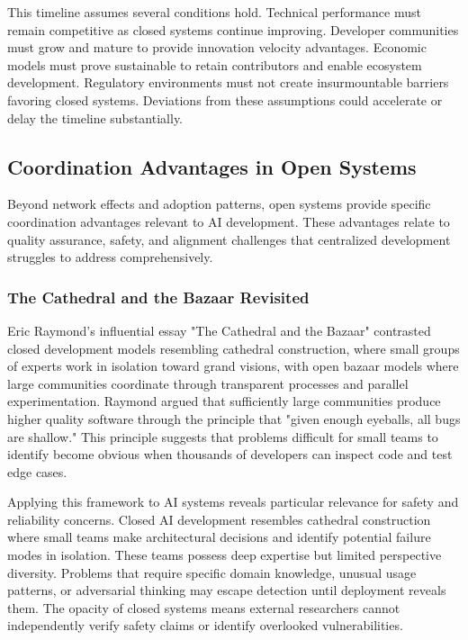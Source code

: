 This timeline assumes several conditions hold. Technical performance must remain competitive as closed systems continue improving. Developer communities must grow and mature to provide innovation velocity advantages. Economic models must prove sustainable to retain contributors and enable ecosystem development. Regulatory environments must not create insurmountable barriers favoring closed systems. Deviations from these assumptions could accelerate or delay the timeline substantially.

\subsection{Coordination Advantages in Open Systems}

Beyond network effects and adoption patterns, open systems provide specific coordination advantages relevant to AI development. These advantages relate to quality assurance, safety, and alignment challenges that centralized development struggles to address comprehensively.

\subsubsection{The Cathedral and the Bazaar Revisited}

Eric Raymond's influential essay "The Cathedral and the Bazaar" contrasted closed development models resembling cathedral construction, where small groups of experts work in isolation toward grand visions, with open bazaar models where large communities coordinate through transparent processes and parallel experimentation. Raymond argued that sufficiently large communities produce higher quality software through the principle that "given enough eyeballs, all bugs are shallow." This principle suggests that problems difficult for small teams to identify become obvious when thousands of developers can inspect code and test edge cases.

Applying this framework to AI systems reveals particular relevance for safety and reliability concerns. Closed AI development resembles cathedral construction where small teams make architectural decisions and identify potential failure modes in isolation. These teams possess deep expertise but limited perspective diversity. Problems that require specific domain knowledge, unusual usage patterns, or adversarial thinking may escape detection until deployment reveals them. The opacity of closed systems means external researchers cannot independently verify safety claims or identify overlooked vulnerabilities.

